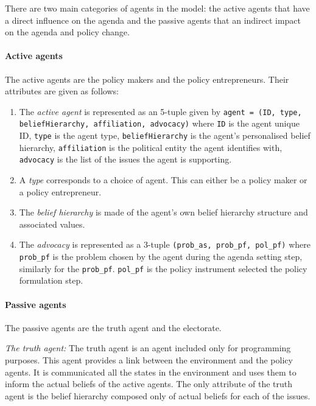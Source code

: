\documentclass[11pt]{article}
\begin{document}
There are two main categories of agents in the model: the active agents that have a direct influence on the agenda and the passive agents that an indirect impact on the agenda and policy change.

\paragraph{Active agents}

The active agents are the policy makers and the policy entrepreneurs. Their attributes are given as follows:

\begin{enumerate}

\item The \emph{active agent} is represented as an 5-tuple given by \texttt{agent = (ID, type, beliefHierarchy, affiliation, advocacy)} where
\texttt{ID} is the agent unique ID,
\texttt{type} is the agent type, 
\texttt{beliefHierarchy} is the agent's personalised belief hierarchy, 
\texttt{affiliation} is the political entity the agent identifies with,  
\texttt{advocacy} is the list of the issues the agent is supporting.

\item A \emph{type} corresponds to a choice of agent. This can either be a policy maker or a policy entrepreneur.

\item The \emph{belief hierarchy} is made of the agent's own belief hierarchy structure and associated values.

\item The \emph{advocacy} is represented as a 3-tuple \texttt{(prob\_as, prob\_pf, pol\_pf)} where \texttt{prob\_pf} is the problem chosen by the agent during the agenda setting step, similarly for the \texttt{prob\_pf}. \texttt{pol\_pf} is the policy instrument selected the policy formulation step.

\end{enumerate}


\paragraph{Passive agents}

The passive agents are the truth agent and the electorate.

\emph{The truth agent:} The truth agent is an agent included only for programming purposes. This agent provides a link between the environment and the policy agents. It is communicated all the states in the environment and uses them to inform the actual beliefs of the active agents. The only attribute of the truth agent is the belief hierarchy composed only of actual beliefs for each of the issues.
\end{document}
